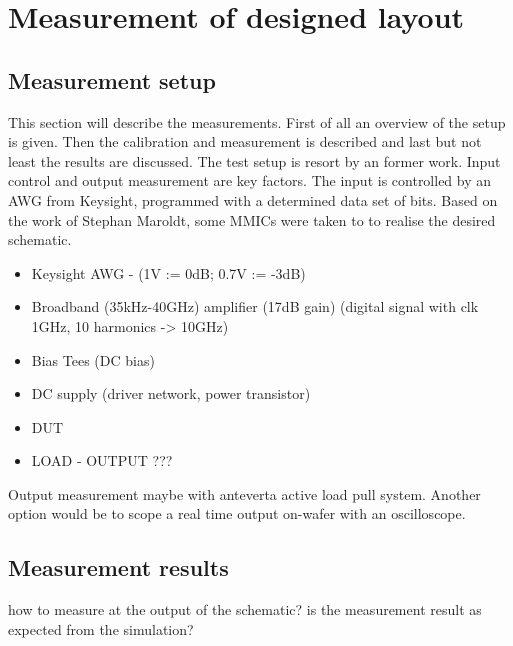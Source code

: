 \chapter{Measurement of designed layout}
\section{Measurement setup}
This section will describe the measurements. First of all an overview of the setup is given. Then the calibration and measurement is described and last but not least the results are discussed. The test setup is resort by an former work.
Input control and output measurement are key factors. The input is controlled by an AWG from Keysight, programmed with a determined data set of bits. Based on the work of Stephan Maroldt, some MMICs were taken to to realise the desired schematic. 
\begin{itemize}
	\item Keysight AWG - (1V := 0dB; 0.7V := -3dB)
	\item Broadband (35kHz-40GHz) amplifier (17dB gain) (digital signal with clk 1GHz, 10 harmonics -> 10GHz)
	\item Bias Tees (DC bias)
	\item DC supply (driver network, power transistor)
	\item DUT
	\item LOAD - OUTPUT ???
\end{itemize}
Output measurement maybe with anteverta active load pull system. Another option would be to scope a real time output on-wafer with an oscilloscope.
\section{Measurement results}
how to measure at the output of the schematic? is the measurement result as expected from the simulation?